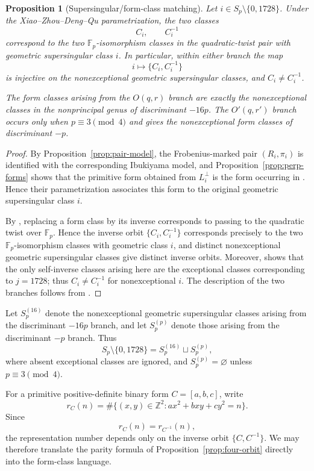 \documentclass[10pt,a4paper]{amsart}
\newtheorem{proposition}[theorem]{Proposition}
\newcommand{\Z}{\mathbb{Z}}
\newcommand{\F}{\mathbb{F}}
\begin{document}
\begin{proposition}[Supersingular/form-class matching]
\label{prop:xzdq-compatibility}
Let $i\in S_p\setminus\{0,1728\}$. Under the
Xiao--Zhou--Deng--Qu parametrization, the two classes
\[
  C_i,\qquad C_i^{-1}
\]
correspond to the two $\F_p$-isomorphism classes in the quadratic-twist
pair with geometric supersingular class $i$. In particular, within either
branch the map
\[
  i\longmapsto\{C_i,C_i^{-1}\}
\]
is injective on the nonexceptional geometric supersingular classes, and
$C_i\ne C_i^{-1}$.

The form classes arising from the $O(q,r)$ branch are exactly the
nonexceptional classes in the nonprincipal genus of discriminant $-16p$.
The $O'(q,r')$ branch occurs only when $p\equiv3\pmod4$ and gives the
nonexceptional form classes of discriminant $-p$.
\end{proposition}

\begin{proof}
By Proposition~\ref{prop:pair-model}, the Frobenius-marked pair
$(R_i,\pi_i)$ is identified with the corresponding Ibukiyama model, and
Proposition~\ref{prop:perp-forms} shows that the primitive form obtained
from $L_i^\perp$ is the form occurring in
\cite[Theorems~3.3 and~3.5]{XZDQ2025}. Hence their parametrization
associates this form to the original geometric supersingular class $i$.

By \cite[Theorem~3.7]{XZDQ2025}, replacing a form class by its inverse
corresponds to passing to the quadratic twist over $\F_p$. Hence the
inverse orbit $\{C_i,C_i^{-1}\}$ corresponds precisely to the two
$\F_p$-isomorphism classes with geometric class $i$, and distinct
nonexceptional geometric supersingular classes give distinct inverse
orbits. Moreover, \cite[Remark~3.6]{XZDQ2025} shows that the only
self-inverse classes arising here are the exceptional classes
corresponding to $j=1728$; thus $C_i\ne C_i^{-1}$ for nonexceptional
$i$. The description of the two branches follows from
\cite[Theorems~3.5 and~3.7]{XZDQ2025}.
\end{proof}

Let $S_p^{(16)}$ denote the nonexceptional geometric supersingular classes
arising from the discriminant $-16p$ branch, and let $S_p^{(p)}$ denote
those arising from the discriminant $-p$ branch. Thus
\[
  S_p\setminus\{0,1728\}
  =
  S_p^{(16)}\sqcup S_p^{(p)},
\]
where absent exceptional classes are ignored, and
$S_p^{(p)}=\varnothing$ unless $p\equiv3\pmod4$.

For a primitive positive-definite binary form $C=[a,b,c]$, write
\[
  r_C(n)
  =
  \#\{(x,y)\in\Z^2:ax^2+bxy+cy^2=n\}.
\]
Since
\[
  r_C(n)=r_{C^{-1}}(n),
\]
the representation number depends only on the inverse orbit
$\{C,C^{-1}\}$. We may therefore translate the parity formula of
Proposition~\ref{prop:four-orbit} directly into the form-class language.
\end{document}
